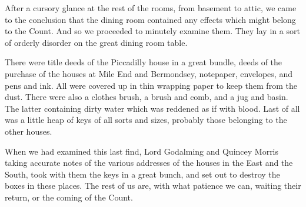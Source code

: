 After a cursory glance at the rest of the rooms, from basement to attic, we came to the conclusion that the dining room contained any effects which might belong to the Count. And so we proceeded to minutely examine them. They lay in a sort of orderly disorder on the great dining room table. 

There were title deeds of the Piccadilly house in a great bundle, deeds of the purchase of the houses at Mile End and Bermondsey, notepaper, envelopes, and pens and ink. All were covered up in thin wrapping paper to keep them from the dust. There were also a clothes brush, a brush and comb, and a jug and basin. The latter containing dirty water which was reddened as if with blood. Last of all was a little heap of keys of all sorts and sizes, probably those belonging to the other houses. 

When we had examined this last find, Lord Godalming and Quincey Morris taking accurate notes of the various addresses of the houses in the East and the South, took with them the keys in a great bunch, and set out to destroy the boxes in these places. The rest of us are, with what patience we can, waiting their return, or the coming of the Count. 

